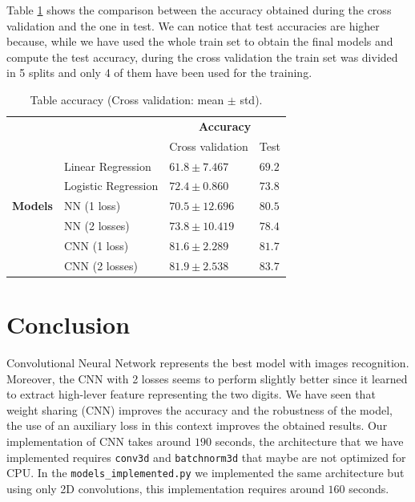 \documentclass[journal, a4paper]{IEEEtran}
\begin{document}
Table \ref{table:accuracy} shows the comparison between the accuracy obtained during the cross validation and the one in test. We can notice that test accuracies are higher because, while we have used the whole train set to obtain the final models and compute the test accuracy, during the cross validation the train set was divided in 5 splits and only 4 of them have been used for the training.
\begin{table}
\centering
\caption{Table accuracy (Cross validation: mean $\pm$ std).}
\label{table:accuracy}
\begin{tabular}{|l|l|l|l|} 
\cline{3-4}
\multicolumn{1}{l}{} &                     & \multicolumn{2}{c|}{\textbf{Accuracy}}  \\ 
\cline{3-4}
\multicolumn{1}{l}{} &                     & Cross validation & Test                 \\ 
\hline
                     & Linear Regression   & $61.8\pm7.467$    & $69.2$                 \\ 
\cline{2-4}
     & Logistic Regression & $72.4 \pm0.860$    & $73.8$                 \\ 
\cline{2-4}
\textbf{Models}    & NN (1 loss)~        & $70.5 \pm12.696$   & $80.5$                 \\ 
\cline{2-4}
                     & NN (2 losses)~      & $73.8 \pm10.419$   & $78.4$                 \\ 
\cline{2-4}
                     & CNN (1 loss)~       & $81.6 \pm2.289$    & $81.7$                 \\ 
\cline{2-4}
                     & CNN (2 losses)      & $81.9 \pm2.538$    & $83.7$                 \\
\hline
\end{tabular}
\end{table}

\section{Conclusion}
\label{sec:conclusion}
Convolutional Neural Network represents the best model with images recognition. Moreover, the CNN with 2 losses seems to perform slightly better since it learned to extract high-lever feature representing the two digits. We have seen that weight sharing (CNN) improves the accuracy and the robustness of the model, the use of an auxiliary loss in this context improves the obtained results. Our implementation of CNN takes around $190$ seconds, the architecture that we have implemented requires \texttt{conv3d} and \texttt{batchnorm3d} that maybe are not optimized for CPU. In the \texttt{models\_implemented.py} we implemented the same architecture but using only 2D convolutions, this implementation requires around $160$ seconds.
\end{document}

